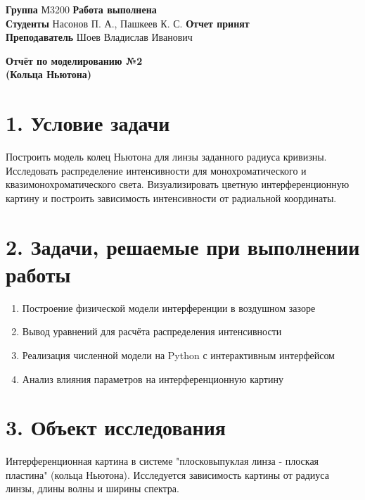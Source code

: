 \documentclass[10pt]{article}
\begin{document}
	
	\textbf{Группа} М3200 \hfill \textbf{Работа выполнена} \underline{\hspace{4cm}} \\[0.5cm]
	\textbf{Студенты} Насонов П. А., Пашкеев К. С. \hfill \textbf{Отчет принят} \underline{\hspace{4cm}} \\[0.5cm]
	\textbf{Преподаватель} Шоев Владислав Иванович \hfill \\
	
	\vspace{1cm}
	
	\begin{center}
		{\LARGE \textbf{Отчёт по моделированию №2\\ (Кольца Ньютона)}}
	\end{center}
	
	\vspace{1cm}
	
	\section*{1. Условие задачи}
	
	Построить модель колец Ньютона для линзы заданного радиуса кривизны. Исследовать распределение интенсивности для монохроматического и квазимонохроматического света. Визуализировать цветную интерференционную картину и построить зависимость интенсивности от радиальной координаты.
	
	\section*{2. Задачи, решаемые при выполнении работы}
	
	\begin{enumerate}
		\item Построение физической модели интерференции в воздушном зазоре
		\item Вывод уравнений для расчёта распределения интенсивности
		\item Реализация численной модели на Python с интерактивным интерфейсом
		\item Анализ влияния параметров на интерференционную картину
	\end{enumerate}
	
	\section*{3. Объект исследования}
	
	Интерференционная картина в системе "плосковыпуклая линза - плоская пластина" (кольца Ньютона). Исследуется зависимость картины от радиуса линзы, длины волны и ширины спектра.
	
\end{document}

